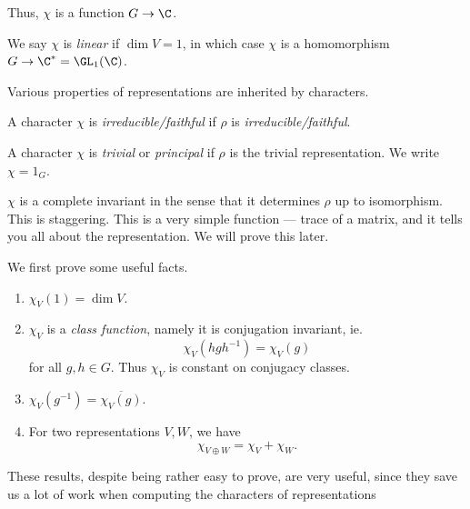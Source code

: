 \documentclass[a4paper]{article}
\begin{document}
Thus, $\chi$ is a function $G \to \C$.
\begin{defi}
  We say $\chi$ is \emph{linear} if $\dim V = 1$, in which case $\chi$ is a homomorphism $G \to \C^* = \GL_1(\C)$.
\end{defi}

Various properties of representations are inherited by characters.
\begin{defi}
  A character $\chi$ is \emph{irreducible/faithful} if $\rho$ is \emph{irreducible/faithful}.
\end{defi}

\begin{defi}
  A character $\chi$ is \emph{trivial} or \emph{principal} if $\rho$ is the trivial representation. We write $\chi = 1_G$.
\end{defi}

$\chi$ is a complete invariant in the sense that it determines $\rho$ up to isomorphism. This is staggering. This is a very simple function --- trace of a matrix, and it tells you all about the representation. We will prove this later.

We first prove some useful facts.
\begin{thm}\leavevmode
  \begin{enumerate}
    \item $\chi_V(1) = \dim V$.
    \item $\chi_V$ is a \emph{class function}, namely it is conjugation invariant, ie.
      \[
        \chi_V(hgh^{-1}) = \chi_V(g)
      \]
      for all $g, h \in G$. Thus $\chi_V$ is constant on conjugacy classes.
    \item $\chi_V(g^{-1}) = \overline{\chi_V(g)}$.
    \item For two representations $V, W$, we have
      \[
        \chi_{V \oplus W} = \chi_V + \chi_W.
      \]
  \end{enumerate}
\end{thm}
These results, despite being rather easy to prove, are very useful, since they save us a lot of work when computing the characters of representations
\end{document}
